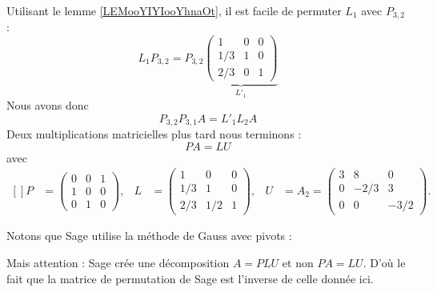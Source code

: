 \begin{example}
    Utilisant le lemme \ref{LEMooYIYIooYhnaOt}, il est facile de permuter \( L_{1}\) avec \( P_{3,2}\) :
    \begin{equation}
        L_1P_{3,2}=P_{3,2}
        \underbrace{
        \begin{pmatrix}
            1    &   0    &   0    \\
            1/3    &   1    &   0    \\
            2/3    &   0    &   1
        \end{pmatrix}}_{L'_1}
    \end{equation}
    Nous avons donc
    \begin{equation}
        P_{3,2}P_{3,1}A=L'_1L_2A
    \end{equation}
    Deux multiplications matricielles plus tard nous terminons :
    \begin{equation}
        PA=LU
    \end{equation}
    avec
    \begin{equation}
        \begin{aligned}[]
        P&=\begin{pmatrix}
            0    &   0    &   1    \\
            1    &   0    &   0    \\
            0    &   1    &   0
        \end{pmatrix},&
        L&=\begin{pmatrix}
            1    &   0    &   0    \\
            1/3    &   1    &   0    \\
            2/3    &   1/2    &   1
        \end{pmatrix},&
        U&=A_2=\begin{pmatrix}
            3    &   8    &   0    \\
            0    &   -2/3    &   3    \\
            0    &   0    &   -3/2
        \end{pmatrix}.
        \end{aligned}
    \end{equation}
\end{example}

Notons que Sage utilise la méthode de Gauss avec pivots :

Mais attention : Sage crée une décomposition \( A=PLU\) et non \( PA=LU\). D'où le fait que la matrice de permutation de Sage est l'inverse de celle donnée ici.

